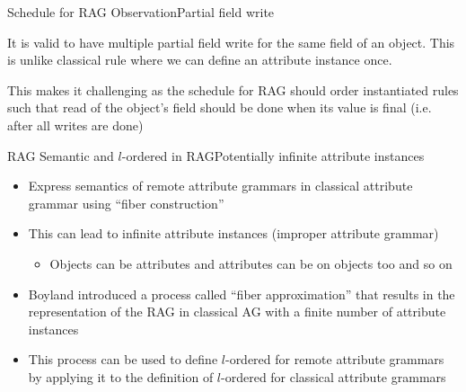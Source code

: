 \begin{frame}{Schedule for RAG Observation}{Partial field write}

It is valid to have \alert{multiple partial field write} for the same field of an object. This is \alert{unlike classical rule} where we can define an attribute instance \alert{once}.

\newlinevspace

This makes it challenging as the schedule for RAG should order instantiated rules such that \alert{read of the object's field} should be done when its value is \alert{final} (i.e. after all writes are done)

\end{frame}






\begin{frame}{RAG Semantic and $l$-ordered in RAG}{Potentially infinite attribute instances}
    
\begin{itemize}
    \item Express \alert{semantics of remote attribute grammars} in classical attribute grammar using \enquote{fiber construction}
    \item This can lead to \alert{infinite} attribute instances (\alert{improper attribute grammar})
    \begin{itemize}
        \item Objects can be attributes and attributes can be on objects too and so on
    \end{itemize}
    \item Boyland \cite{Boyland05remoteattribute} introduced a process called \enquote{fiber approximation} that results in the representation of the RAG in classical AG with a \alert{finite number of attribute instances}
    \item This process can be used to define $l$-ordered for remote attribute grammars by applying it to the definition of $l$-ordered for classical attribute grammars 
\end{itemize}

\end{frame}

